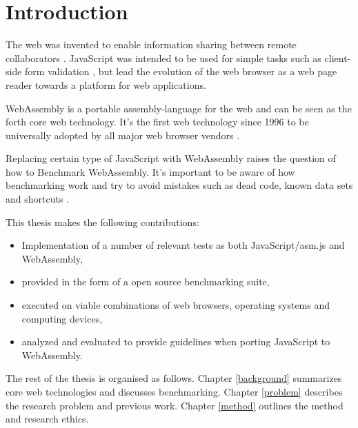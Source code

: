 \section{Introduction}
\label{introduction}

The web was invented to enable information sharing between remote collaborators \parencite{BernersLeeCailliauLuotonenNielsenSecret1994}. JavaScript was intended to be used for simple tasks such as client-side form validation \parencite{Moller2018}, but lead the evolution of the web browser as a web page reader towards a platform for web applications.

WebAssembly is a portable assembly-language for the web \parencite{HaasRossbergSchuffTitzerHolmanGohmanWagnerZakaiBastien2017} and can be seen as the forth core web technology. It's the first web technology since 1996 to be universally adopted by all major web browser vendors \parencite{HaasRossbergSchuffTitzerHolmanGohmanWagnerZakaiBastien2017}.

Replacing certain type of JavaScript with WebAssembly raises the question of how to Benchmark WebAssembly. It's important to be aware of how benchmarking work and try to avoid mistakes such as dead code, known data sets and shortcuts \parencite{CaiNerurkarWu1998}.

This thesis makes the following contributions:

\begin{itemize}
    \item Implementation of a number of relevant tests as both JavaScript/asm.js and WebAssembly,
    \item provided in the form of a open source benchmarking suite,
    \item executed on viable combinations of web browsers, operating systems and computing devices,
    \item analyzed and evaluated to provide guidelines when porting JavaScript to WebAssembly.
\end{itemize}

The rest of the thesis is organised as follows. Chapter \ref{background} summarizes core web technologies and discusses benchmarking. Chapter \ref{problem} describes the research problem and previous work. Chapter \ref{method} outlines the method and research ethics. 

